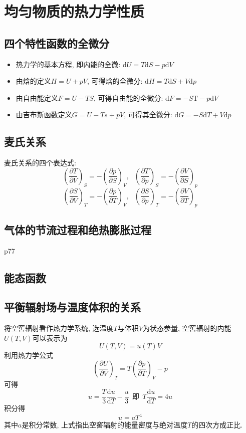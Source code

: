 \section{均匀物质的热力学性质}
\subsection{四个特性函数的全微分}
\begin{itemize}
    \item 热力学的基本方程, 即内能的全微: $\mathrm{d}U=T\mathrm{d}S-p\mathrm{d}V$
    \item 由焓的定义$H=U+pV$, 可得焓的全微分: $\mathrm{d}H=T\mathrm{d}S+V\mathrm{d}p$
    \item 由自由能定义$F=U-TS$, 可得自由能的全微分: $\mathrm{d}F=-S\mathrm{T}-p\mathrm{d}V$
    \item 由吉布斯函数定义$G=U-Ts+pV$, 可得其全微分: $\mathrm{d}G=-S\mathrm{d}T+V\mathrm{d}p$
\end{itemize}

\subsection{麦氏关系}
麦氏关系的四个表达式:
$$
    \left(\frac{\partial T}{\partial V}\right)_S=-\left(\frac{\partial p
    }{\partial S}\right)_V, \ \ \ \left(\frac{\partial T}{\partial
        p}\right)_S=-\left(\frac{\partial V }{\partial S}\right)_p
$$
$$
    \left(\frac{\partial S}{\partial V}\right)_T=-\left(\frac{\partial p
    }{\partial T}\right)_V, \ \ \ \left(\frac{\partial S}{\partial
        p}\right)_T=-\left(\frac{\partial V }{\partial T}\right)_p
$$

\subsection{气体的节流过程和绝热膨胀过程}
p77

\subsection{能态函数}
\subsection{平衡辐射场与温度体积的关系}
将空窖辐射看作热力学系统, 选温度$T$与体积$V$为状态参量, 空窖辐射的内能$U(T,V)$可以表示为
$$
    U(T,V)=u(T)V
$$
利用热力学公式
$$
    \left(\frac{\partial U}{\partial V}\right)_T=T\left(\frac{\partial p
    }{\partial T}\right)_V-p
$$
可得
$$
    u=\frac{T}{3}\frac{\mathrm{d}u}{\mathrm{d}T}-\frac{u}{3} \ \
    \mathrm{即} \ \ T\frac{\mathrm{d}u}{\mathrm{d}T}=4u
$$
积分得
$$
    u=aT^4
$$
其中$a$是积分常数, 上式指出空窖辐射的能量密度与绝对温度$T$的四次方成正比.

